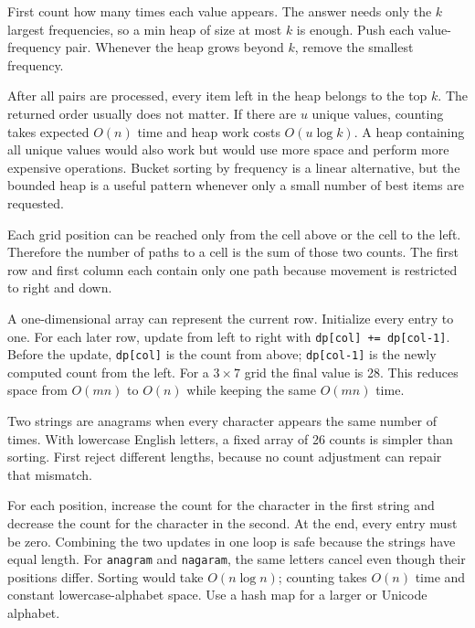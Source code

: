 \expandafter\def\csname sourcewalkthrough@62\endcsname{%
First count how many times each value appears. The answer needs only the
\(k\) largest frequencies, so a min heap of size at most \(k\) is enough.
Push each value-frequency pair. Whenever the heap grows beyond \(k\), remove
the smallest frequency.

After all pairs are processed, every item left in the heap belongs to the top
\(k\). The returned order usually does not matter. If there are \(u\) unique
values, counting takes expected \(O(n)\) time and heap work costs
\(O(u\log k)\). A heap containing all unique values would also work but would
use more space and perform more expensive operations. Bucket sorting by
frequency is a linear alternative, but the bounded heap is a useful pattern
whenever only a small number of best items are requested.}

\expandafter\def\csname sourcewalkthrough@63\endcsname{%
Each grid position can be reached only from the cell above or the cell to the
left. Therefore the number of paths to a cell is the sum of those two counts.
The first row and first column each contain only one path because movement is
restricted to right and down.

A one-dimensional array can represent the current row. Initialize every entry
to one. For each later row, update from left to right with
\texttt{dp[col] += dp[col-1]}. Before the update, \texttt{dp[col]} is the
count from above; \texttt{dp[col-1]} is the newly computed count from the
left. For a \(3\times7\) grid the final value is 28. This reduces space from
\(O(mn)\) to \(O(n)\) while keeping the same \(O(mn)\) time.}

\expandafter\def\csname sourcewalkthrough@64\endcsname{%
Two strings are anagrams when every character appears the same number of
times. With lowercase English letters, a fixed array of 26 counts is simpler
than sorting. First reject different lengths, because no count adjustment can
repair that mismatch.

\enlargethispage{2\baselineskip}
For each position, increase the count for the character in the first string
and decrease the count for the character in the second. At the end, every
entry must be zero. Combining the two updates in one loop is safe because the
strings have equal length. For \texttt{anagram} and \texttt{nagaram}, the same
letters cancel even though their positions differ. Sorting would take
\(O(n\log n)\); counting takes \(O(n)\) time and constant lowercase-alphabet
space. Use a hash map for a larger or Unicode alphabet.}

